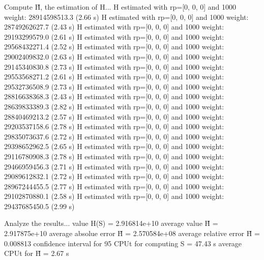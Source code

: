 Compute H̃, the estimation of H...
  H estimated with rp=[0, 0, 0] and 1000 weight:  28914598513.3  (2.66 s)
  H estimated with rp=[0, 0, 0] and 1000 weight:  28749262627.7  (2.43 s)
  H estimated with rp=[0, 0, 0] and 1000 weight:  29193299579.0  (2.61 s)
  H estimated with rp=[0, 0, 0] and 1000 weight:  29568432271.4  (2.52 s)
  H estimated with rp=[0, 0, 0] and 1000 weight:  29002409832.0  (2.63 s)
  H estimated with rp=[0, 0, 0] and 1000 weight:  29145340830.8  (2.73 s)
  H estimated with rp=[0, 0, 0] and 1000 weight:  29553568271.2  (2.61 s)
  H estimated with rp=[0, 0, 0] and 1000 weight:  29532736508.9  (2.73 s)
  H estimated with rp=[0, 0, 0] and 1000 weight:  28816638368.3  (2.43 s)
  H estimated with rp=[0, 0, 0] and 1000 weight:  28639833389.3  (2.82 s)
  H estimated with rp=[0, 0, 0] and 1000 weight:  28840469213.2  (2.57 s)
  H estimated with rp=[0, 0, 0] and 1000 weight:  29203537158.6  (2.78 s)
  H estimated with rp=[0, 0, 0] and 1000 weight:  29835073637.6  (2.72 s)
  H estimated with rp=[0, 0, 0] and 1000 weight:  29398652962.5  (2.65 s)
  H estimated with rp=[0, 0, 0] and 1000 weight:  29116780908.3  (2.78 s)
  H estimated with rp=[0, 0, 0] and 1000 weight:  29466959456.3  (2.71 s)
  H estimated with rp=[0, 0, 0] and 1000 weight:  29089612832.1  (2.72 s)
  H estimated with rp=[0, 0, 0] and 1000 weight:  28967244455.5  (2.77 s)
  H estimated with rp=[0, 0, 0] and 1000 weight:  29102870880.1  (2.58 s)
  H estimated with rp=[0, 0, 0] and 1000 weight:  29437685450.5  (2.99 s)

Analyze the results...
  value H(S)                  = 2.916814e+10 
  average value H̃             = 2.917875e+10 
  average absolue error H̃     = 2.570584e+08 
  average relative error H̃    = 0.008813 
  confidence interval for 95%
  CPUt for computing S         = 47.43 s
  average CPUt for H̃           = 2.67 s

